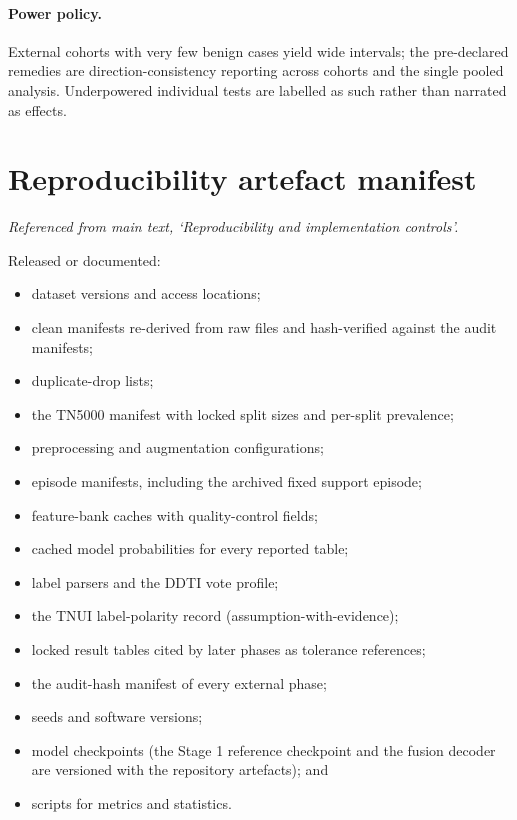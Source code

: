 \documentclass[11pt]{article}
\begin{document}
\paragraph{Power policy.}
External cohorts with very few benign cases yield wide intervals; the
pre-declared remedies are direction-consistency reporting across cohorts
and the single pooled analysis. Underpowered individual tests are labelled
as such rather than narrated as effects.


\section{Reproducibility artefact manifest}\label{sm:repro}

\noindent\emph{Referenced from main text, `Reproducibility and implementation controls'.}

Released or documented:

\begin{itemize}
  \item dataset versions and access locations;
  \item clean manifests re-derived from raw files and hash-verified
  against the audit manifests;
  \item duplicate-drop lists;
  \item the TN5000 manifest with locked split sizes and per-split
  prevalence;
  \item preprocessing and augmentation configurations;
  \item episode manifests, including the archived fixed support episode;
  \item feature-bank caches with quality-control fields;
  \item cached model probabilities for every reported table;
  \item label parsers and the DDTI vote profile;
  \item the TNUI label-polarity record (assumption-with-evidence);
  \item locked result tables cited by later phases as tolerance
  references;
  \item the audit-hash manifest of every external phase;
  \item seeds and software versions;
  \item model checkpoints (the Stage 1 reference checkpoint and the
  fusion decoder are versioned with the repository artefacts); and
  \item scripts for metrics and statistics.
\end{itemize}
\end{document}
